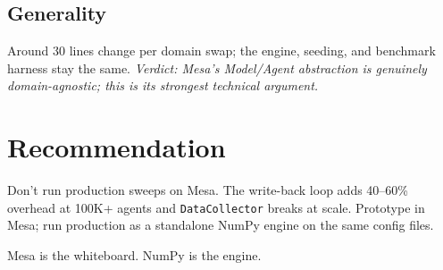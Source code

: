 \documentclass[11pt, a4paper]{article}
\begin{document}
\subsection{Generality}
Around 30 lines change per domain swap; the engine, seeding, and
benchmark harness stay the same.
\textit{Verdict: Mesa's Model/Agent abstraction is genuinely domain-agnostic; this is its strongest technical argument.}

\section{Recommendation}

Don't run production sweeps on Mesa. The write-back loop adds 40--60\%
overhead at 100K+ agents and \texttt{DataCollector} breaks at scale.
Prototype in Mesa; run production as a standalone NumPy engine on the
same config files.

\medskip
\noindent Mesa is the whiteboard. NumPy is the engine.
\end{document}
